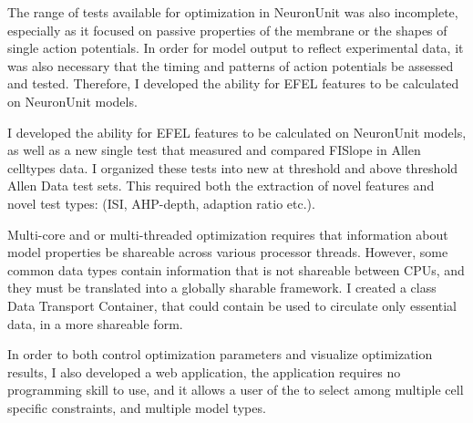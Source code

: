 The range of tests available for optimization in NeuronUnit was also incomplete, especially as it focused on passive properties of the membrane or the shapes of single action potentials.  In order for model output to reflect experimental data, it was also necessary that the timing and patterns of action potentials be assessed and tested.  Therefore, I developed the ability for EFEL features to be calculated on NeuronUnit models. 


I developed the ability for EFEL features to be calculated on NeuronUnit models, as well as a new single test that measured and compared FISlope in Allen celltypes data. I organized these tests into new at threshold and above threshold Allen Data test sets. This required both the extraction of novel features and novel test types: (ISI, AHP-depth, adaption ratio etc.).   


Multi-core and or multi-threaded optimization requires that information about model properties be shareable across various processor threads. However, some common data types contain information that is not shareable between CPUs, and they must be translated into a globally sharable framework. I created a class Data Transport Container, that could contain be used to circulate only essential data, in a more shareable form. 

In order to both control optimization parameters and visualize optimization results, I also developed a web application, the application requires no programming skill to use, and it allows a user of the to select among multiple cell specific constraints, and multiple model types. %


%
%




